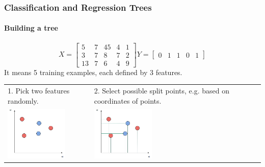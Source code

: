 \begin{frame}
	\frametitle{Classification and Regression Trees}
		\framesubtitle{Building a tree}
		\[
		X=
		\left[ {\begin{array}{ccccc}
		5 & 7 & 45 & 4 & 1\\
		3 & 7 & 8 & 7 & 2\\
		13 & 7 & 6 & 4 & 9
		\end{array} } \right]
		Y=
		\left[ {\begin{array}{ccccc}
		0 & 1 & 1 & 0 & 1
		\end{array} } \right]
		\] 
		It means 5 training examples, each defined by 3 features.
		\begin{center}
		\begin{tabular}{m{5cm} m{5cm}}
		1. Pick two features randomly.
		&
		2. Select possible split points, e.g. based on coordinates of points. \\
		\includegraphics[width=3cm]{./figures/macierz1}
		&
		\includegraphics[width=3cm]{./figures/macierz2}
		\\
		\end{tabular}
		\end{center}
		
\end{frame}

